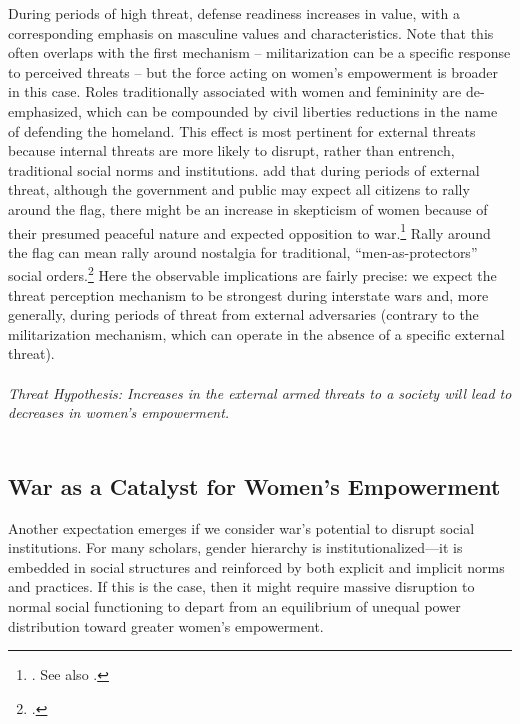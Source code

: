 \documentclass [12pt] {article}
\begin{document}
During periods of high threat, defense readiness increases in value, with a corresponding emphasis on masculine values and characteristics. Note that this often overlaps with the first mechanism -- militarization can be a specific response to perceived threats -- but the force acting on women's empowerment is broader in this case. Roles traditionally associated with women and femininity are de-emphasized, which can be compounded by civil liberties reductions in the name of defending the homeland. This effect is most pertinent for external threats because internal threats are more likely to disrupt, rather than entrench, traditional social norms and institutions. \citeauthor{tir2017painting} add that during periods of external threat, although the government and public may expect all citizens to rally around the flag, there might be an increase in skepticism of women because of their presumed peaceful nature and expected opposition to war.\footnote{. See also .} Rally around the flag can mean rally around nostalgia for traditional, ``men-as-protectors'' social orders.\footnote{.} Here the observable implications are fairly precise: we expect the threat perception mechanism to be strongest during interstate wars and, more generally, during periods of threat from external adversaries (contrary to the militarization mechanism, which can operate in the absence of a specific external threat). \\ \\


\emph{Threat Hypothesis: Increases in the external armed threats to a society will lead to decreases in women's empowerment.} \\ \\

\subsection*{War as a Catalyst for Women's Empowerment}
\vspace*{.2in}

Another expectation emerges if we consider war's potential to disrupt social institutions. For many scholars, gender hierarchy is institutionalized---it is embedded in social structures and reinforced by both explicit and implicit norms and practices. If this is the case, then it might require massive disruption to normal social functioning to depart from an equilibrium of unequal power distribution toward greater women's empowerment. \\ 
\end{document}

